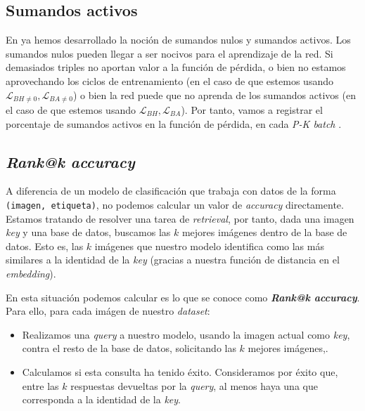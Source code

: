 \subsection{Sumandos activos}

En  ya hemos desarrollado la noción de sumandos nulos y sumandos activos. Los sumandos nulos pueden llegar a ser nocivos para el aprendizaje de la red. Si demasiados triples no aportan valor a la función de pérdida, o bien no estamos aprovechando los ciclos de entrenamiento (en el caso de que estemos usando $\mathcal{L}_{BH \neq 0}, \mathcal{L}_{BA \neq 0}$) o bien  la red puede que no aprenda de los sumandos activos (en el caso de que estemos usando $\mathcal{L}_{BH}, \mathcal{L}_{BA}$). Por tanto, vamos a registrar el porcentaje de sumandos activos en la función de pérdida, en cada \textit{P-K batch} \footnotemark.


\subsection{\textit{Rank@k accuracy}} \label{isubs:rank_at_k}

A diferencia de un modelo de clasificación que trabaja con datos de la forma \lstinline{(imagen, etiqueta)}, no podemos calcular un valor de \textit{accuracy} directamente. Estamos tratando de resolver una tarea de \textit{retrieval}, por tanto, dada una imagen \textit{key} y una base de datos, buscamos las $k$  mejores imágenes dentro de la base de datos. Esto es, las $k$ imágenes que nuestro modelo identifica como las más similares a la identidad de la \textit{key} (gracias a nuestra función de distancia en el \textit{embedding}).

En esta situación podemos calcular es lo que se conoce como \textbf{\textit{Rank@k accuracy}}. Para ello, para cada imágen de nuestro \textit{dataset}:

\begin{itemize}
    \item Realizamos una \textit{query} a nuestro modelo, usando la imagen actual como \textit{key}, contra el resto de la base de datos, solicitando las $k$ mejores imágenes,.
    \item Calculamos si esta consulta ha tenido éxito. Consideramos por éxito que, entre las $k$ respuestas devueltas por la \textit{query}, al menos haya una que corresponda a la identidad de la \textit{key}.
\end{itemize}

